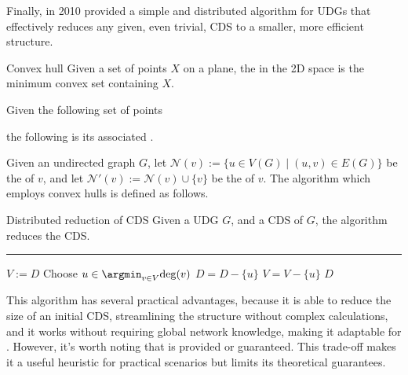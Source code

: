 \documentclass[a4paper, 12pt]{report}
\begin{document}
    Finally, in 2010 \textcite{purohit} provided a simple and distributed algorithm for UDGs that effectively reduces any given, even trivial, CDS to a smaller, more efficient structure.

    \begin{frameddefn}{Convex hull}
        Given a set of points $X$ on a plane, the  in the 2D space is the minimum convex set containing $X$.
    \end{frameddefn}

    \begin{example}
        Given the following set of points 

        the following is its associated . 
    \end{example}

    Given an undirected graph $G$, let $\mathcal N(v) := \{u \in V(G) \mid (u, v) \in E(G)\}$ be the  of $v$, and let $\mathcal N'(v) := \mathcal N (v) \cup \{v\}$ be the  of $v$. The algorithm which employs convex hulls is defined as follows.

    \begin{framedalgo}{Distributed reduction of CDS}
        Given a UDG $G$, and a CDS of $G$, the algorithm reduces the CDS. \\
        \hrule

        \quad
        \label{alg:distributed_reduce_CDS}
        \begin{algorithmic}[1]
                \State $V := D$
                \Do
                    \State Choose $u \in \argmin_{v \in V}{\deg(v)}$
                     
                        \State $D = D - \{u\}$
                    \EndIf
                    \State $V = V - \{u\}$
                \State {} $D$
            \EndFunction
        \end{algorithmic}
    \end{framedalgo}

    This algorithm has several practical advantages, because it is able to reduce the size of an initial CDS, streamlining the structure without complex calculations, and it works without requiring global network knowledge, making it adaptable for . However, it's worth noting that  is provided or guaranteed. This trade-off makes it a useful heuristic for practical scenarios but limits its theoretical guarantees.
\end{document}
